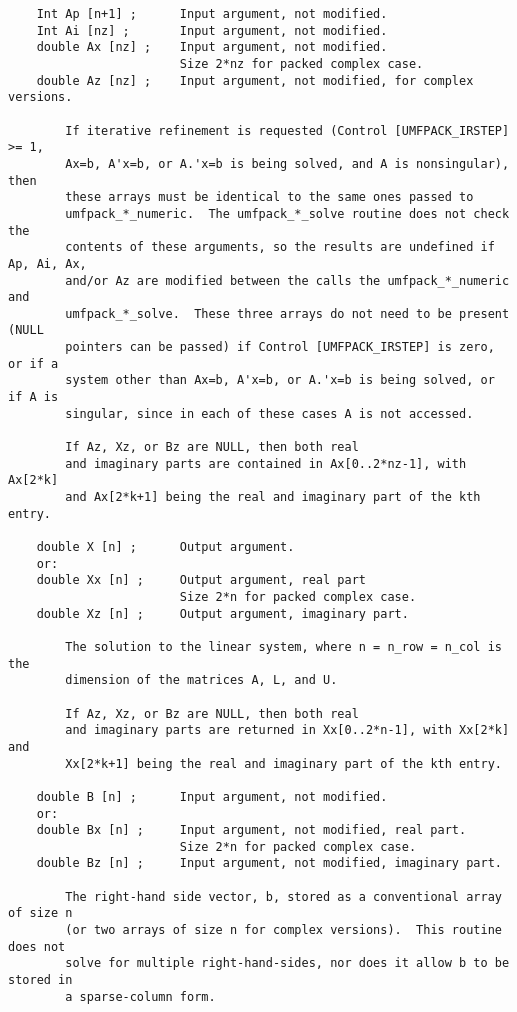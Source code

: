 \documentclass[11pt]{article}
\begin{document}
{\begin{verbatim}
    Int Ap [n+1] ;      Input argument, not modified.
    Int Ai [nz] ;       Input argument, not modified.
    double Ax [nz] ;    Input argument, not modified.
                        Size 2*nz for packed complex case.
    double Az [nz] ;    Input argument, not modified, for complex versions.

        If iterative refinement is requested (Control [UMFPACK_IRSTEP] >= 1,
        Ax=b, A'x=b, or A.'x=b is being solved, and A is nonsingular), then
        these arrays must be identical to the same ones passed to
        umfpack_*_numeric.  The umfpack_*_solve routine does not check the
        contents of these arguments, so the results are undefined if Ap, Ai, Ax,
        and/or Az are modified between the calls the umfpack_*_numeric and
        umfpack_*_solve.  These three arrays do not need to be present (NULL
        pointers can be passed) if Control [UMFPACK_IRSTEP] is zero, or if a
        system other than Ax=b, A'x=b, or A.'x=b is being solved, or if A is
        singular, since in each of these cases A is not accessed.

        If Az, Xz, or Bz are NULL, then both real
        and imaginary parts are contained in Ax[0..2*nz-1], with Ax[2*k]
        and Ax[2*k+1] being the real and imaginary part of the kth entry.

    double X [n] ;      Output argument.
    or:
    double Xx [n] ;     Output argument, real part
                        Size 2*n for packed complex case.
    double Xz [n] ;     Output argument, imaginary part.

        The solution to the linear system, where n = n_row = n_col is the
        dimension of the matrices A, L, and U.

        If Az, Xz, or Bz are NULL, then both real
        and imaginary parts are returned in Xx[0..2*n-1], with Xx[2*k] and
        Xx[2*k+1] being the real and imaginary part of the kth entry.

    double B [n] ;      Input argument, not modified.
    or:
    double Bx [n] ;     Input argument, not modified, real part.
                        Size 2*n for packed complex case.
    double Bz [n] ;     Input argument, not modified, imaginary part.

        The right-hand side vector, b, stored as a conventional array of size n
        (or two arrays of size n for complex versions).  This routine does not
        solve for multiple right-hand-sides, nor does it allow b to be stored in
        a sparse-column form.


\end{verbatim}}
\end{document}
